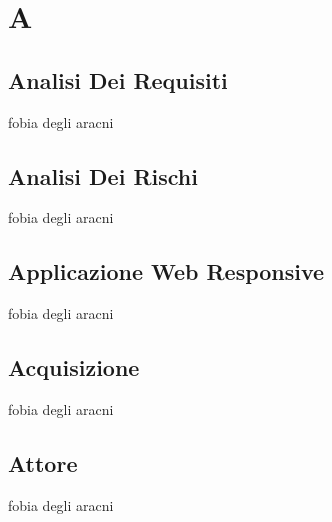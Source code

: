 \section{A} 
\subsection{Analisi Dei Requisiti} 
fobia degli aracni
\subsection{Analisi Dei Rischi} 
fobia degli aracni
\subsection{Applicazione Web Responsive} 
fobia degli aracni
\subsection{Acquisizione} 
fobia degli aracni
\subsection{Attore} 
fobia degli aracni
